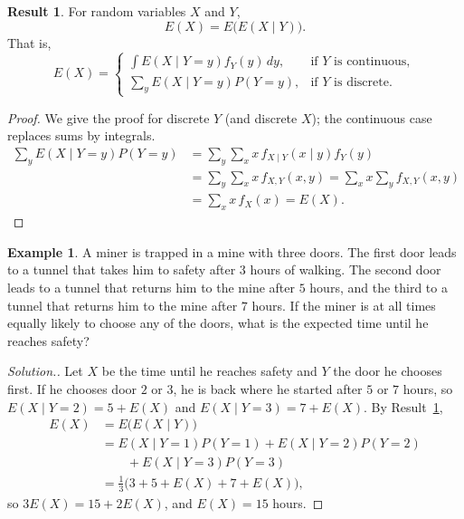 \documentclass[11pt,a4paper]{article}
\theoremstyle{definition}
\newtheorem{exa}[thm]{Example}
\newtheorem{result}[thm]{Result}
\newenvironment{solution}
  {\renewcommand{\qedsymbol}{}\begin{proof}[\textit{Solution}.]}
  {\end{proof}}
\begin{document}
\begin{result}\label{res:tower}
For random variables $X$ and $Y$,
\[
E(X) = E\bigl(E(X \mid Y)\bigr) .
\]
That is,
\[
E(X) = \begin{cases} \displaystyle\int E(X \mid Y = y)f_Y(y)\,dy , & \text{if } Y \text{ is continuous} , \\[2ex] \displaystyle\sum_yE(X \mid Y = y)P(Y = y) , & \text{if } Y \text{ is discrete.} \end{cases}
\]
\end{result}

\begin{proof}
We give the proof for discrete $Y$ (and discrete $X$); the continuous case replaces sums by integrals.
\begin{align*}
\sum_yE(X \mid Y = y)P(Y = y) &= \sum_y\sum_xx\,f_{X\mid Y}(x \mid y)f_Y(y) \\
&= \sum_y\sum_xx\,f_{X,Y}(x, y) = \sum_xx\sum_yf_{X,Y}(x, y) \\
&= \sum_xx\,f_X(x) = E(X) .
\end{align*}
\end{proof}

\begin{exa}\label{exa:miner}
A miner is trapped in a mine with three doors. The first door leads to a tunnel that takes him to safety after $3$ hours of
walking. The second door leads to a tunnel that returns him to the mine after $5$ hours, and the third to a tunnel that returns him
to the mine after $7$ hours. If the miner is at all times equally likely to choose any of the doors, what is the expected time until
he reaches safety?
\end{exa}

\begin{solution}
Let $X$ be the time until he reaches safety and $Y$ the door he chooses first. If he chooses door $2$ or $3$, he is back where he started
after $5$ or $7$ hours, so $E(X \mid Y = 2) = 5 + E(X)$ and $E(X \mid Y = 3) = 7 + E(X)$. By Result~\ref{res:tower},
\begin{align*}
E(X) &= E\bigl(E(X \mid Y)\bigr) \\
&= E(X \mid Y = 1)P(Y = 1) + E(X \mid Y = 2)P(Y = 2) \\
&\qquad + E(X \mid Y = 3)P(Y = 3) \\
&= \tfrac13\bigl(3 + 5 + E(X) + 7 + E(X)\bigr) ,
\end{align*}
so $3E(X) = 15 + 2E(X)$, and $E(X) = 15$ hours.
\end{solution}
\end{document}
